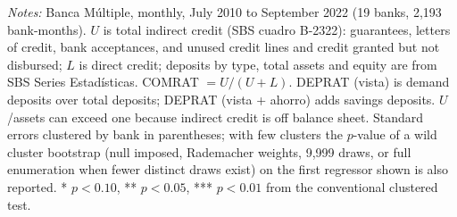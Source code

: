 \begin{table}[!h]
\begin{threeparttable}[b]
      \begin{tablenotes}\item \textit{Notes:} Banca M\'ultiple, monthly, July 2010 to September 2022 (19 banks, 2,193 bank-months). $U$ is total indirect credit (SBS cuadro B-2322): guarantees, letters of credit, bank acceptances, and unused credit lines and credit granted but not disbursed; $L$ is direct credit; deposits by type, total assets and equity are from SBS Series Estad\'isticas. COMRAT $= U/(U+L)$. DEPRAT (vista) is demand deposits over total deposits; DEPRAT (vista + ahorro) adds savings deposits. $U$/assets can exceed one because indirect credit is off balance sheet. Standard errors clustered by bank in parentheses; with few clusters the $p$-value of a wild cluster bootstrap (null imposed, Rademacher weights, 9,999 draws, or full enumeration when fewer distinct draws exist) on the first regressor shown is also reported. * $p<0.10$, ** $p<0.05$, *** $p<0.01$ from the conventional clustered test.
      \end{tablenotes}
   \end{threeparttable}
\end{table}


